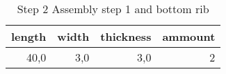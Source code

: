 \begin{table}[h!]
\centering
\caption{Step 2 Assembly step 1 and bottom rib}
\begin{tabular}{rrrr}
\toprule
 length &  width &  thickness &  ammount \\
\midrule
   40,0 &    3,0 &        3,0 &        2 \\
\bottomrule
\end{tabular}
\end{table}
